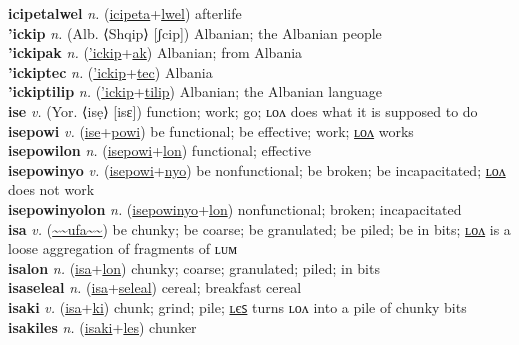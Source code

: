 \textbf{icipetalwel} \textit{n.} (\hyperref[icipeta]{icipeta}+\hyperref[lwel]{lwel})
afterlife \label{icipetalwel} \\
\textbf{'ickip} \textit{n.} (Alb. ⟨Shqip⟩ [ʃcip])
Albanian; the Albanian people \label{'ickip} \\
\textbf{'ickipak} \textit{n.} (\hyperref['ickip]{'ickip}+\hyperref[ak]{ak})
Albanian; from Albania \label{'ickipak} \\
\textbf{'ickiptec} \textit{n.} (\hyperref['ickip]{'ickip}+\hyperref[tec]{tec})
Albania \label{'ickiptec} \\
\textbf{'ickiptilip} \textit{n.} (\hyperref['ickip]{'ickip}+\hyperref[tilip]{tilip})
Albanian; the Albanian language \label{'ickiptilip} \\
\textbf{ise} \textit{v.} (Yor. ⟨isẹ⟩ [isɛ])
function; work; go; ʟᴏᴧ does what it is supposed to do \label{ise} \\
\textbf{isepowi} \textit{v.} (\hyperref[ise]{ise}+\hyperref[powi]{powi})
be functional; be effective; work; \hyperref[isepowilon]{ʟᴏᴧ} works \label{isepowi} \\
\textbf{isepowilon} \textit{n.} (\hyperref[isepowi]{isepowi}+\hyperref[lon]{lon})
functional; effective \label{isepowilon} \\
\textbf{isepowinyo} \textit{v.} (\hyperref[isepowi]{isepowi}+\hyperref[nyo]{nyo})
be nonfunctional; be broken; be incapacitated; \hyperref[isepowinyolon]{ʟᴏᴧ} does not work \label{isepowinyo} \\
\textbf{isepowinyolon} \textit{n.} (\hyperref[isepowinyo]{isepowinyo}+\hyperref[lon]{lon})
nonfunctional; broken; incapacitated \label{isepowinyolon} \\
\textbf{isa} \textit{v.} (\hyperref[ufa]{\~{}\~{}ufa\~{}\~{}})
be chunky; be coarse; be granulated; be piled; be in bits; \hyperref[isalon]{ʟᴏᴧ} is a loose aggregation of fragments of ʟᴜᴍ \label{isa} \\
\textbf{isalon} \textit{n.} (\hyperref[isa]{isa}+\hyperref[lon]{lon})
chunky; coarse; granulated; piled; in bits \label{isalon} \\
\textbf{isaseleal} \textit{n.} (\hyperref[isa]{isa}+\hyperref[seleal]{seleal})
cereal; breakfast cereal \label{isaseleal} \\
\textbf{isaki} \textit{v.} (\hyperref[isa]{isa}+\hyperref[ki]{ki})
chunk; grind; pile; \hyperref[isakiles]{ʟєꜱ} turns ʟᴏᴧ into a pile of chunky bits \label{isaki} \\
\textbf{isakiles} \textit{n.} (\hyperref[isaki]{isaki}+\hyperref[les]{les})
chunker \label{isakiles} \\
